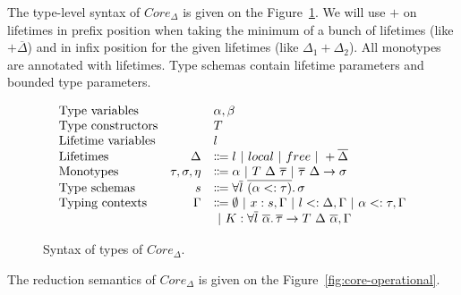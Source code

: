 \documentclass[11pt]{article}
\newcommand{\vor}{~|~}
\newcommand{\ap}{~}
\begin{document}
    The type-level syntax of $Core_\Delta$ is given on the Figure\ \ref{fig:core-types}.
    We will use $+$ on lifetimes in prefix position when taking the minimum of a bunch of lifetimes (like $+\overline{\Delta}$) and in infix position for the given lifetimes (like $\Delta_1 + \Delta_2$).
    All monotypes are annotated with lifetimes.
    Type schemas contain lifetime parameters and bounded type parameters.

    \begin{figure}
        \[
            \begin{array}{lrl}
                \text{Type variables}     &                    & \alpha, \beta                                                                                                      \\
                \text{Type constructors}  &                    & T                                                                                                                  \\
                \text{Lifetime variables} &                    & l                                                                                                                  \\
                \text{Lifetimes}          & \Delta             & \Coloneqq l \vor local \vor free \vor +\overline{\Delta}                                                           \\
                \text{Monotypes}          & \tau, \sigma, \eta & \Coloneqq \alpha \vor T \ap \Delta \ap \overline{\tau} \vor \overline{\tau}~\Delta \to \sigma                      \\
                \text{Type schemas}       & s                  & \Coloneqq \forall \overline{l}~\overline{(\alpha <: \tau)}\ldotp \sigma                                            \\
                \text{Typing contexts}    & \Gamma             & \Coloneqq \emptyset \vor x : s, \Gamma \vor l <: \Delta, \Gamma \vor \alpha <: \tau, \Gamma                        \\
                &                    & \vor K : \forall \overline{l}\ \overline{\alpha}\ldotp \overline{\tau}\to T \ap\Delta\ap \overline{\alpha}, \Gamma
            \end{array}
        \]
        \caption{Syntax of types of $Core_\Delta$.}
        \label{fig:core-types}
    \end{figure}

    The reduction semantics of $Core_\Delta$ is given on the Figure\ \ref{fig:core-operational}.
\end{document}
